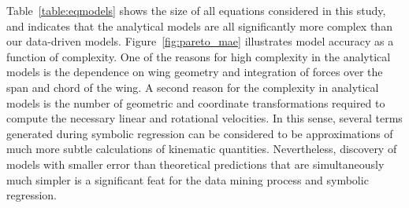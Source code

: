 \documentclass{article}
\begin{document}
Table~\ref{table:eqmodels} shows the size of all equations considered in this
study, and indicates that the analytical models are all significantly more
complex than our data-driven models.  Figure~\ref{fig:pareto_mae} illustrates
model accuracy as a function of complexity.  One of the reasons for high
complexity in the analytical models is the dependence on wing geometry and
integration of forces over the span and chord of the wing.  A second reason for
the complexity in analytical models is the number of geometric and coordinate
transformations required to compute the necessary linear and rotational
velocities.  In this sense, several terms generated during symbolic regression
can be considered to be approximations of much more subtle calculations of
kinematic quantities. Nevertheless, discovery of models with smaller error than
theoretical predictions that are simultaneously much simpler is a significant
feat for the data mining process and symbolic regression.
\end{document}
